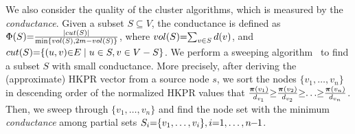 We also consider the quality of the cluster algorithms, which is measured by the {\em conductance}. Given a subset $S  \subseteq V$, the conductance is defined as $\Phi(S)\hspace{-1mm}=\hspace{-1mm}\frac{|cut(S)|}{\min\{vol(S),2m-vol(S)\}}$, where $vol(S)\hspace{-1mm}=\hspace{-1mm}\sum_{v \in S}d(v)$, and $cut(S)\hspace{-1mm}=\hspace{-1mm}\{(u,v)\hspace{-1mm}\in\hspace{-1mm} E \mid u \in S, v \in V-S \}$.
We perform a sweeping algorithm~\cite{Teng2004Nibble,FOCS06_FS,chung2007HKPR,chung2018computing,yang2019TEA} to find a subset $S$ with small conductance. More precisely, after deriving the (approximate) HKPR vector from a source node $s$, we sort the nodes $\{v_1, \ldots, v_n\}$ in descending order of the normalized HKPR values that $\frac{\vec{\pi}(v_1)}{d_{v_1}}\hspace{-1mm}\ge\hspace{-1mm} \frac{\vec{\pi}(v_2)}{d_{v_2}} \hspace{-1mm}\ge \hspace{-1mm}\ldots \hspace{-1mm}\ge \hspace{-1mm}\frac{\vec{\pi}(v_n)}{d_{v_n}}$. %
Then, we sweep through $\{v_1, \ldots, v_n\}$ and find the node set with the minimum {\em conductance} among partial sets $S_i\hspace{-1mm} =\hspace{-1mm} \{v_1, \ldots,v_i\}, i\hspace{-1mm}=\hspace{-1mm}1,\ldots,n\hspace{-1mm}-\hspace{-1mm}1 $.



